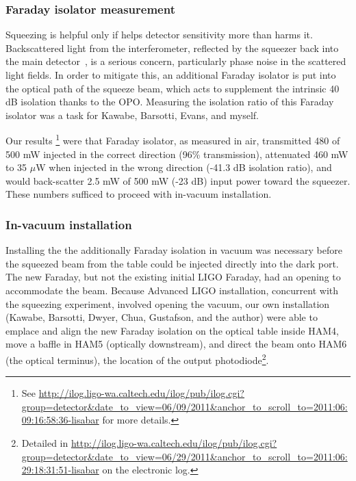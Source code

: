             \subsubsection{Faraday isolator measurement}
            \label{Faraday}



Squeezing is helpful only if helps detector sensitivity more than harms it.
Backscattered light from the interferometer, reflected by the squeezer back into the main detector~\cite{ChuaThesis,BarsottiNatureSqueezing}, is a serious concern, particularly phase noise in the scattered light fields.
In order to mitigate this, an additional Faraday isolator is put into the optical path of the squeeze beam, which acts to supplement the intrinsic 40 dB isolation thanks to the OPO.
Measuring the isolation ratio of this Faraday isolator was a task for Kawabe, Barsotti, Evans, and myself.

Our results \footnote{See \url{http://ilog.ligo-wa.caltech.edu/ilog/pub/ilog.cgi?group=detector&date_to_view=06/09/2011&anchor_to_scroll_to=2011:06:09:16:58:36-lisabar} for more details.} were that Faraday isolator, as measured in air, transmitted 480 of 500 mW injected in the correct direction (96\% transmission), attenuated 460 mW to 35 $\mu$W when injected in the wrong direction (-41.3 dB isolation ratio), and would back-scatter 2.5 mW of 500 mW (-23 dB) input power toward the squeezer. 
These numbers sufficed to proceed with in-vacuum installation.

            \subsubsection{In-vacuum installation}
            \label{In-vacuum}

Installing the the additionally Faraday isolation in vacuum was necessary before the squeezed beam from the table could be injected directly into the dark port.
The new Faraday, but not the existing initial LIGO Faraday, had an opening to accommodate the beam. 
Because Advanced LIGO installation, concurrent with the squeezing experiment, involved opening the vacuum, our own installation (Kawabe, Barsotti, Dwyer, Chua, Gustafson, and the author) were able to emplace and align the new Faraday isolation on the optical table inside HAM4, move a baffle in HAM5 (optically downstream), and direct the beam onto HAM6 (the optical terminus), the location of the output photodiode\footnote{Detailed in \url{http://ilog.ligo-wa.caltech.edu/ilog/pub/ilog.cgi?group=detector&date_to_view=06/29/2011&anchor_to_scroll_to=2011:06:29:18:31:51-lisabar} on the electronic log.}.

